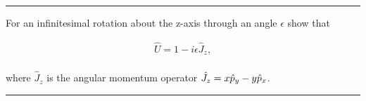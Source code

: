\noindent\rule{7in}{1.5pt}


\begin{problem}{9.2}
    For an infinitesimal rotation about the z-axis through an angle $\epsilon$ show that

    \begin{align*}
        \hat{U} = 1-i\epsilon \hat{J}_z,
    \end{align*}\\
    where $\hat{J}_z$ is the angular momentum operator $\hat{J}_z = x \hat{p}_y - y\hat{p}_x $. 
\end{problem}
\begin{solution}

\end{solution}

\noindent\rule{7in}{1.5pt}


